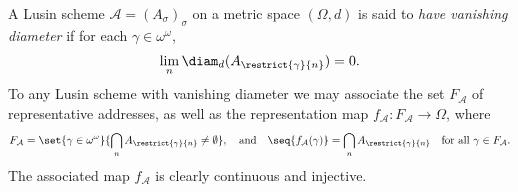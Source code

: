 \begin{definition}
    A Lusin scheme $\mathcal{A} = (A_\sigma)_\sigma$ on a metric space $(\Omega, d)$ is said to \textit{have vanishing diameter} if for each $\gamma \in \omega^\omega$, 
    \begin{align*}
        \lim_n \diam_d(A_{\restrict{\gamma}{n}}) = 0.
    \end{align*}
    To any Lusin scheme with vanishing diameter we may associate the set $F_{\mathcal{A}}$ of representative addresses, as well as the representation map $f_{\mathcal{A}}: F_{\mathcal{A}} \to \Omega$, where
    \begin{align*}
        F_{\mathcal{A}} = \set{\gamma \in \omega^\omega}{\bigcap_n A_{\restrict{\gamma}{n}} \neq \emptyset}, \quad \text{and} \quad \seq{f_{\mathcal{A}}(\gamma)} = \bigcap_n A_{\restrict{\gamma}{n}} \quad \text{for all $\gamma \in F_{\mathcal{A}}$}.
    \end{align*}
    The associated map $f_{\mathcal{A}}$ is clearly continuous and injective.
    \label{def:vanishes_to_zero}
\end{definition}

